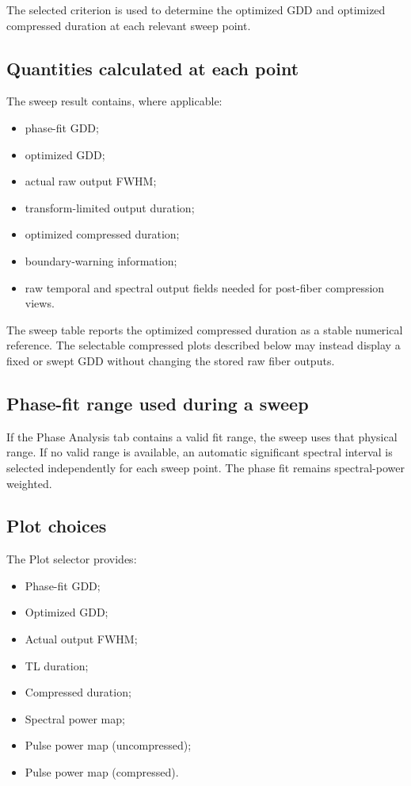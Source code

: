\documentclass[11pt,a4paper]{article}
\begin{document}
The selected criterion is used to determine the optimized GDD and optimized
compressed duration at each relevant sweep point.

\subsection{Quantities calculated at each point}

The sweep result contains, where applicable:

\begin{itemize}
    \item phase-fit GDD;
    \item optimized GDD;
    \item actual raw output FWHM;
    \item transform-limited output duration;
    \item optimized compressed duration;
    \item boundary-warning information;
    \item raw temporal and spectral output fields needed for post-fiber
    compression views.
\end{itemize}

The sweep table reports the optimized compressed duration as a stable numerical
reference. The selectable compressed plots described below may instead display
a fixed or swept GDD without changing the stored raw fiber outputs.

\subsection{Phase-fit range used during a sweep}

If the Phase Analysis tab contains a valid fit range, the sweep uses that
physical range. If no valid range is available, an automatic significant
spectral interval is selected independently for each sweep point. The phase fit
remains spectral-power weighted.

\subsection{Plot choices}

The Plot selector provides:

\begin{itemize}
    \item Phase-fit GDD;
    \item Optimized GDD;
    \item Actual output FWHM;
    \item TL duration;
    \item Compressed duration;
    \item Spectral power map;
    \item Pulse power map (uncompressed);
    \item Pulse power map (compressed).
\end{itemize}
\end{document}
